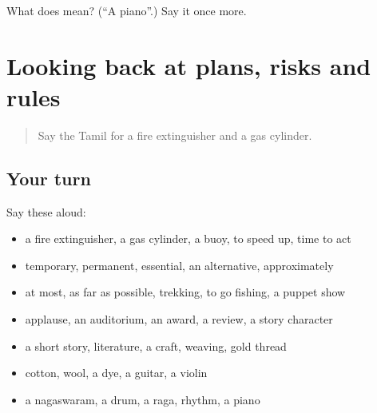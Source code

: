 \begin{tcolorbox}[breakable,colback=teal!4,colframe=teal!35!black,title={Before you move on}]
What does  mean? (\textquotedblleft{}A piano\textquotedblright{}.) Say it once more.
\end{tcolorbox}
\section[(dialogue)]{Looking back at plans, risks and rules}

\label{lesson:TA-R558-review-552-558}



\begin{quote}
Say the Tamil for a fire extinguisher and a gas cylinder.
\end{quote}

\subsection*{Your turn}
Say these aloud:

\begin{itemize}
\raggedright
  \item a fire extinguisher, a gas cylinder, a buoy, to speed up, time to act
  \item temporary, permanent, essential, an alternative, approximately
  \item at most, as far as possible, trekking, to go fishing, a puppet show
  \item applause, an auditorium, an award, a review, a story character
  \item a short story, literature, a craft, weaving, gold thread
  \item cotton, wool, a dye, a guitar, a violin
  \item a nagaswaram, a drum, a raga, rhythm, a piano
\end{itemize}

